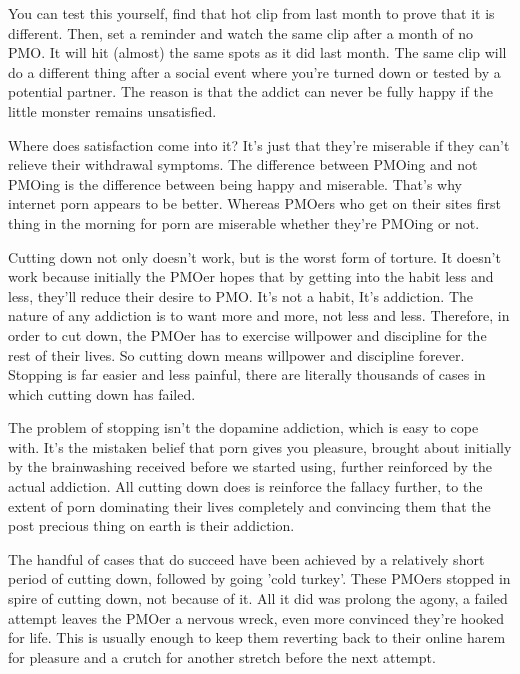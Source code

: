 \documentclass[easypeasy.tex]{subfiles}
\begin{document}
You can test this yourself, find that hot clip from last month to prove that it is different. Then, set a reminder and watch the same clip after a month of no PMO. It will hit (almost) the same spots as it did last month. The same clip will do a different thing after a social event where you're turned down or tested by a potential partner. The reason is that the addict can never be fully happy if the little monster remains unsatisfied.

Where does satisfaction come into it? It's just that they're miserable if they can't relieve their withdrawal symptoms. The difference between PMOing and not PMOing is the difference between being happy and miserable. That's why internet porn appears to be better. Whereas PMOers who get on their sites first thing in the morning for porn are miserable whether they're PMOing or not.

Cutting down not only doesn't work, but is the worst form of torture. It doesn't work because initially the PMOer hopes that by getting into the habit less and less, they'll reduce their desire to PMO. It's not a habit, It's addiction. The nature of any addiction is to want more and more, not less and less. Therefore, in order to cut down, the PMOer has to exercise willpower and discipline for the rest of their lives. So cutting down means willpower and discipline forever. Stopping is far easier and less painful, there are literally thousands of cases in which cutting down has failed.

The problem of stopping isn't the dopamine addiction, which is easy to cope with. It's the mistaken belief that porn gives you pleasure, brought about initially by the brainwashing received before we started using, further reinforced by the actual addiction. All cutting down does is reinforce the fallacy further, to the extent of porn dominating their lives completely and convincing them that the post precious thing on earth is their addiction.

The handful of cases that do succeed have been achieved by a relatively short period of cutting down, followed by going 'cold turkey'. These PMOers stopped in spire of cutting down, not because of it. All it did was prolong the agony, a failed attempt leaves the PMOer a nervous wreck, even more convinced they're hooked for life. This is usually enough to keep them reverting back to their online harem for pleasure and a crutch for another stretch before the next attempt.
\end{document}
